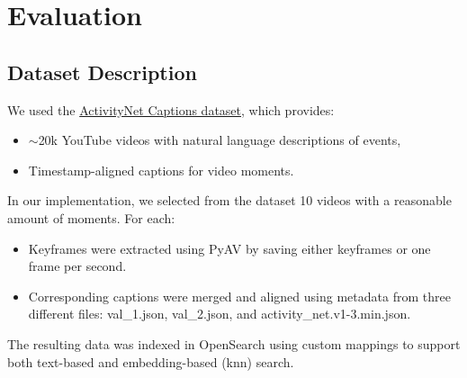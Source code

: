 \documentclass[runningheads]{llncs}
\begin{document}
\section{Evaluation}

\subsection{Dataset Description}
We used the \href{https://huggingface.co/datasets/HuggingFaceM4/ActivitiyNet_Captions}{ActivityNet Captions dataset}, which provides:

\begin{itemize}
    \item \ensuremath{\sim}20k YouTube videos with natural language descriptions of events,
    \item Timestamp-aligned captions for video moments.
\end{itemize}

In our implementation, we selected from the dataset 10 videos with a reasonable amount of moments. For each:

\begin{itemize}
    \item Keyframes were extracted using PyAV by saving either keyframes or one frame per second.
    \item Corresponding captions were merged and aligned using metadata from three different files: val\_1.json, val\_2.json, and activity\_net.v1-3.min.json.
\end{itemize}

The resulting data was indexed in OpenSearch using custom mappings to support both text-based and embedding-based (knn) search.
\end{document}
